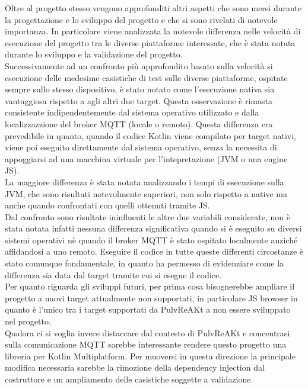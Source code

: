 \documentclass[12pt,a4paper,openright,twoside]{book}
\begin{document}
Oltre al progetto stesso vengono approfonditi altri aspetti che sono mersi durante la progettazione e lo sviluppo del progetto e che si sono rivelati di notevole importanza. 
In particolare viene analizzata la notevole differenza nelle velocità di esecuzione del progetto tra le diverse piattaforme interessate, 
che è stata notata durante lo sviluppo e la validazione del progetto.\\
Successivamente ad un confronto più approfondito basato sulla velocità si esecuzione delle medesime casistiche di test sulle diverse piattaforme, 
ospitate sempre sullo stesso dispositivo, è stato notato come l'esecuzione nativa sia vantaggiosa rispetto a agli altri due target.
Questa osservazione è rimasta consistente indipendentemente dal sistema operativo utilizzato e dalla localizzazzione del broker \ac{MQTT} (locale o remoto).
Questa differenza era prevedibile in quanto, quando il codice Kotlin viene compilato per target nativi, viene poi eseguito direttamente dal sistema operativo, 
senza la necessita di appoggiarsi ad una macchina virtuale per l'intepretazione (\ac{JVM} o una engine \ac{JS}).\\
La maggiore differenza è stata notata analizzando i tempi di esecuzione sulla \ac{JVM}, che sono risultati notevolmente superiori, non solo rispetto a native 
ma anche quando confrontati con quelli ottenuti tramite \ac{JS}.\\
Dal confronto sono risultate ininfluenti le altre due variabili considerate, non è stata notata infatti nessuna differenza significativa quando si è eseguito su 
diversi sistemi operativi nè quando il broker \ac{MQTT} è stato ospitato localmente anziché affidandosi a uno remoto. Eseguire il codice in tutte queste differenti 
circostanze è stato comunque fondamentale, in quanto ha permesso di evidenziare come la differenza sia data dal target tramite cui si esegue il codice.\\

Per quanto riguarda gli sviluppi futuri, per prima cosa bisognerebbe ampliare il progetto a nuovi target attualmente non supportati, 
in particolare \ac{JS} browser in quanto è l'unico tra i target supportati da PulvReAKt a non essere sviluppato nel progetto.\\
Qualora ci si voglia invece distaccare dal contesto di PulvReAKt e concentrasi sulla comunicazione \ac{MQTT} sarebbe interessante rendere questo progetto 
una libreria per Kotlin Multiplatform. Per muoversi in questa direzione la principale modifica necessaria sarebbe la rimozione della dependency injection dal costruttore 
e un ampliamento delle casistiche soggette a validazione. 
\end{document}
